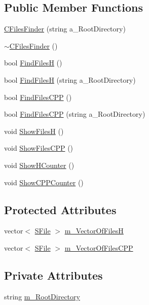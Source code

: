 \subsection*{Public Member Functions}
\begin{DoxyCompactItemize}
\item 
\hyperlink{class_c_files_finder_a2d82e60f3f4a90fa03d680ad0801abea}{C\+Files\+Finder} (string a\+\_\+\+Root\+Directory)
\item 
\hyperlink{class_c_files_finder_aa35e985107f5cb7997a31d787de31aba}{$\sim$\+C\+Files\+Finder} ()
\item 
bool \hyperlink{class_c_files_finder_a1a904fd47c4d9a1766cb18562a9e083b}{Find\+Files\+H} ()
\item 
bool \hyperlink{class_c_files_finder_abf39e6926090d2d0494b5ca18d40617f}{Find\+Files\+H} (string a\+\_\+\+Root\+Directory)
\item 
bool \hyperlink{class_c_files_finder_a6669f0338caec55ef9d4407fffd4440f}{Find\+Files\+C\+P\+P} ()
\item 
bool \hyperlink{class_c_files_finder_aa18e8c325b9da120f55d0091f802e95c}{Find\+Files\+C\+P\+P} (string a\+\_\+\+Root\+Directory)
\item 
void \hyperlink{class_c_files_finder_ae391c3d03d56c7f9af84ad2a52085365}{Show\+Files\+H} ()
\item 
void \hyperlink{class_c_files_finder_a4c7cc8eab39706cd8dc9c73e186f98f7}{Show\+Files\+C\+P\+P} ()
\item 
void \hyperlink{class_c_files_finder_a0aee1050295a066330dc0f2974089006}{Show\+H\+Counter} ()
\item 
void \hyperlink{class_c_files_finder_a7929f2dcfcd7bef8e1530e999eb05a4d}{Show\+C\+P\+P\+Counter} ()
\end{DoxyCompactItemize}
\subsection*{Protected Attributes}
\begin{DoxyCompactItemize}
\item 
vector$<$ \hyperlink{struct_c_files_finder_1_1_s_file}{S\+File} $>$ \hyperlink{class_c_files_finder_a2a737438eb2515c0d494b0d4edca3808}{m\+\_\+\+Vector\+Of\+Files\+H}
\item 
vector$<$ \hyperlink{struct_c_files_finder_1_1_s_file}{S\+File} $>$ \hyperlink{class_c_files_finder_a2c6b3e50076b2a5e84a872982fd74f8e}{m\+\_\+\+Vector\+Of\+Files\+C\+P\+P}
\end{DoxyCompactItemize}
\subsection*{Private Attributes}
\begin{DoxyCompactItemize}
\item 
string \hyperlink{class_c_files_finder_a4ed42fa95872f6c774ce1b1672877f96}{m\+\_\+\+Root\+Directory}
\end{DoxyCompactItemize}
